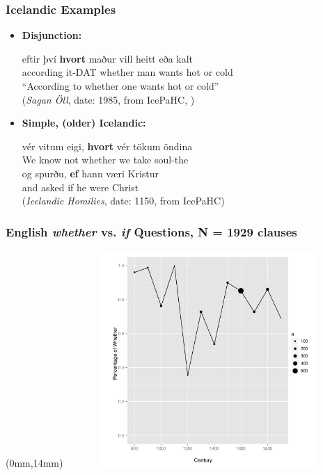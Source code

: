 \documentclass[hyperref={pdfpagelabels=false}]{beamer}
\begin{document}
\begin{frame}
\frametitle{Icelandic Examples}
\begin{itemize}
\item[ ]\textbf{Disjunction:}
\begin{exe}
	\ex \gll eftir því \textbf{hvort} maður vill heitt eða kalt\\
	according it-DAT whether man wants hot or cold\\
	\quad ``According to whether one wants hot or cold'' \\(\textsl{Sagan Öll}, date: 1985, from IcePaHC, \citealt{icepahc09})
\end{exe}
\item[ ]\textbf{Simple, (older) Icelandic:}
\begin{exe}
	\ex \gll vér vitum eigi, \textbf{hvort} vér tökum öndina\\
	We know not whether we take soul-the\\
	\ex \gll og spurðu, \textbf{ef} hann væri Kristur\\
	and asked if he were Christ\\
	(\textsl{Icelandic Homilies}, date: 1150, from IcePaHC)
\end{exe}
\end{itemize}
\end{frame}

\begin{frame} 
 \frametitle{English \textsl{whether} vs. \textsl{if} Questions, N = 1929 clauses}

\begin{center}
 
 \begin{textblock*}{125mm}(0mm,14mm)
\includegraphics[width=109mm,height=82mm,clip=true,trim=0mm 0mm 0mm 0mm]{whetherifEngSimple.pdf}
\end{textblock*}
\end{center}
\end{frame}
\end{document}
